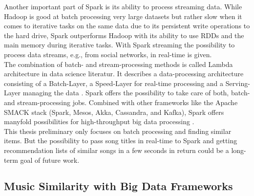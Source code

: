 \noindent Another important part of Spark is its ability to process streaming data. While Hadoop is good at batch processing very large datasets but rather slow when it comes to iterative tasks on the same data due to its persistent write operations to the hard drive, Spark outperforms Hadoop with its ability to use RDDs and the main memory during iterative tasks. 
With Spark streaming the possibility to process data streams, e.g., from social networks, in real-time is given.\\
The combination of batch- and stream-processing methods is called Lambda architecture in data science literatur. It describes a data-processing architecture consisting of a Batch-Layer, a Speed-Layer for real-time processing and a Serving-Layer managing the data \cite[pp. 8 f]{nextgenbig}. Spark offers the possibility to take care of both, batch- and stream-processing jobs. Combined with other frameworks like the Apache SMACK stack (Spark, Mesos, Akka, Cassandra, and Kafka), Spark offers manyfold possibilities for high-throughput big data processing \cite[p. 5]{smack}.\\
This thesis preliminary only focuses on batch processing and finding similar items. But the possibility to pass song titles in real-time to Spark and getting recommendation lists of similar songs in a few seconds in return could be a long-term goal of future work.\\

\subsection{Music Similarity with Big Data Frameworks}

